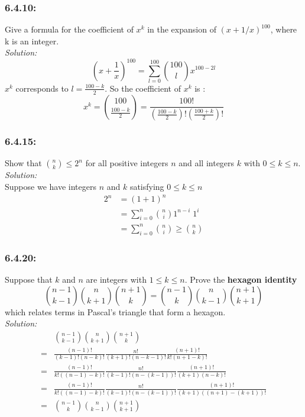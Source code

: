 \documentclass[a4paper]{article}
\begin{document}
	\subsubsection*{6.4.10:}
	Give a formula for the coefficient of $x^{k}$ in the expansion of $(x + 1/x)^{100}$, where k is an integer. \\
	\emph{Solution:}
	\begin{equation*}
	    (x + \frac{1}{x})^{100} = \sum_{l = 0}^{100} {100 \choose l} x^{100 - 2l}
	\end{equation*}
	$x^{k}$ corresponds to $l = \frac{100-k}{2}$. So the coefficient of $x^{k}$ is :
	\begin{equation*}
	    x^{k} = {100 \choose {\frac{100-k}{2}}} = \frac{100!}{(\frac{100-k}{2})!(\frac{100+k}{2})!}
	\end{equation*}
	\subsubsection*{6.4.15:}
	Show that ${n \choose k} \leq 2^n$ for all positive integers $n$ and all integers $k$ with $0 \leq k \leq n$.\\
	\textit{Solution:}\\
	Suppose we have integers $n$ and $k$ satisfying $0 \leq k \leq n$
	\begin{align*}
	2^n & = (1+1)^n \\
	& = \sum_{i=0}^{n} {n \choose i} 1^{n-i}\;1^i \\
	& = \sum_{i=0}^{n} {n \choose i} \geq {n \choose k}
	\end{align*}
	
	\subsubsection*{6.4.20:}
	Suppose that $k$ and $n$ are integers with $1 \leq k \leq n$. Prove the \textbf{hexagon identity}
	\begin{equation*}
	    {n-1 \choose k-1}{n \choose k+1}{n+1 \choose k} = {n-1 \choose k}{n \choose k-1}{n+1 \choose k+1}
	\end{equation*}
	which relates terms in Pascal's triangle that form a hexagon. \\
	\textit{Solution:} \\
	\begin{align*}
	& {n-1 \choose k-1}{n \choose k+1}{n+1 \choose k} \\
	= & \frac{(n-1)!}{(k-1)!(n-k)!} \frac{n!}{(k+1)!(n-k-1)!} \frac{(n+1)!}{k!(n+1-k)!} \\
	= & \frac{(n-1)!}{k!((n-1)-k)!} \frac{n!}{(k-1)!(n-(k-1))!} \frac{(n+1)!}{(k+1)(n-k)!} \\
	= & \frac{(n-1)!}{k!((n-1)-k)!} \frac{n!}{(k-1)!(n-(k-1))!} \frac{(n+1)!}{(k+1)((n+1)-(k+1))!} \\
	= & {n-1 \choose k}{n \choose k-1}{n+1 \choose k+1}
	\end{align*}
	
\end{document}
